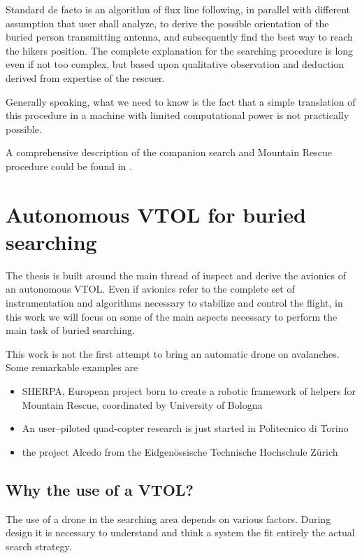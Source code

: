 Standard de facto is an algorithm of flux line following, in parallel with different assumption that user shall analyze, to derive the possible orientation of the buried person transmitting antenna, and subsequently find the best way to reach the hikers position. The complete explanation for the searching procedure is long even if not too complex, but based upon qualitative observation and deduction derived from expertise of the rescuer.

Generally speaking, what we need to know is the fact that a simple translation of this procedure in a machine with limited computational power is not practically possible.

A comprehensive description of the companion search and Mountain Rescue procedure could be found in \citep{ManualeSciAlpinismo}.

\section{Autonomous VTOL for buried searching}

The thesis is built around the main thread of inspect and derive the avionics of an autonomous VTOL. Even if avionics refer to the complete set of instrumentation and algorithms necessary to stabilize and control the flight, in this work we will focus on some of the main aspects necessary to perform the main task of buried searching.

This work is not the first attempt to bring an automatic drone on avalanches. Some remarkable examples are 
\begin{itemize}
\item SHERPA, European project born to create a robotic framework of helpers for Mountain Rescue, coordinated by University of Bologna
\item An user--piloted quad-copter research is just started in Politecnico di Torino
\item the project Alcedo from the Eidgen\"{o}ssische Technische Hochschule Z\"{u}rich\cite{projectAlcedoZurigo}
\end{itemize}

\subsection{Why the use of a VTOL?}
The use of a drone in the searching area depends on various factors. During design it is necessary to understand and think a system the fit entirely the actual search strategy.

